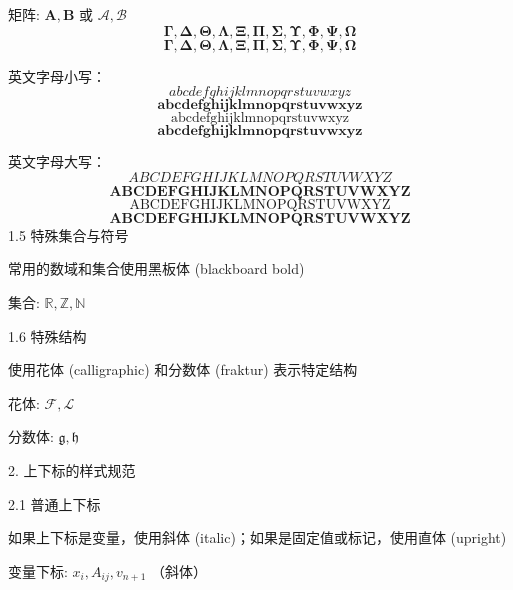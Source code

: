\documentclass{article}
\begin{document}
矩阵: $\boldsymbol{A}, \boldsymbol{B}$ 或 $\mathcal{A}, \mathcal{B}$
\begin{equation}
  \boldsymbol{\Gamma, \Delta, \Theta, \Lambda, \Xi, \Pi, \Sigma, \Upsilon, \Phi, \Psi, \Omega}
\end{equation}
\begin{equation}
  \symbf{\Gamma, \Delta, \Theta, \Lambda, \Xi, \Pi, \Sigma, \Upsilon, \Phi, \Psi, \Omega}
\end{equation}

英文字母小写：
\begin{equation}
  abcdefghijklmnopqrstuvwxyz 
\end{equation}
\begin{equation}
  \boldsymbol{abcdefghijklmnopqrstuvwxyz} 
\end{equation}
\begin{equation}
  \mathrm{abcdefghijklmnopqrstuvwxyz}
\end{equation}
\begin{equation}
  \mathbf{abcdefghijklmnopqrstuvwxyz}
\end{equation}

英文字母大写：
\begin{equation}
  ABCDEFGHIJKLMNOPQRSTUVWXYZ 
\end{equation}
\begin{equation}
  \boldsymbol{ABCDEFGHIJKLMNOPQRSTUVWXYZ} 
\end{equation}
\begin{equation}
  \mathrm{ABCDEFGHIJKLMNOPQRSTUVWXYZ}
\end{equation}
\begin{equation}
  \mathbf{ABCDEFGHIJKLMNOPQRSTUVWXYZ}
\end{equation}
1.5 特殊集合与符号

常用的数域和集合使用黑板体 (blackboard bold)

集合: $\mathbb{R}, \mathbb{Z}, \mathbb{N}$

1.6 特殊结构

使用花体 (calligraphic) 和分数体 (fraktur) 表示特定结构

花体: $\mathcal{F}, \mathcal{L}$

分数体: $\mathfrak{g}, \mathfrak{h}$


2. 上下标的样式规范

2.1 普通上下标

如果上下标是变量，使用斜体 (italic)；如果是固定值或标记，使用直体 (upright)

变量下标: $x_i, A_{ij}, v_{n+1}$ （斜体）
\end{document}
